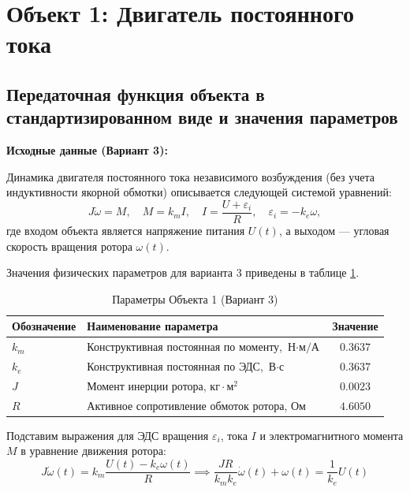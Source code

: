 \documentclass[12pt, a4paper]{article}
\begin{document}
\graphicspath{{images/}}
\newpage
\section{Объект 1: Двигатель постоянного тока}

\subsection{Передаточная функция объекта в стандартизированном виде и значения параметров}

\textbf{Исходные данные (Вариант 3):}

Динамика двигателя постоянного тока независимого возбуждения (без учета индуктивности якорной обмотки) описывается следующей системой уравнений:
\begin{equation}
    J\dot{\omega} = M, \quad M = k_m I, \quad I = \frac{U + \varepsilon_i}{R}, \quad \varepsilon_i = -k_e\omega,
\end{equation}
где входом объекта является напряжение питания $U(t)$, а выходом — угловая скорость вращения ротора $\omega(t)$.

Значения физических параметров для варианта 3 приведены в таблице \ref{tab:obj1_params}.

\begin{table}[H]
\centering
\caption{Параметры Объекта 1 (Вариант 3)}
\label{tab:obj1_params}
\setlength{\tabcolsep}{10pt} %
\renewcommand{\arraystretch}{1.3} %
\begin{tabular}{@{} >{\raggedright\arraybackslash}p{3cm} >{\raggedright\arraybackslash}p{8.5cm} c @{}}
\toprule
\textbf{Обозначение} & \textbf{Наименование параметра} & \textbf{Значение} \\ \midrule
$k_m$ & Конструктивная постоянная по моменту, $\text{Н}\cdot\text{м/А}$ & $0.3637$ \\
$k_e$ & Конструктивная постоянная по ЭДС, $\text{В}\cdot\text{с}$ & $0.3637$ \\
$J$   & Момент инерции ротора, $\text{кг}\cdot\text{м}^2$ & $0.0023$ \\
$R$   & Активное сопротивление обмоток ротора, $\text{Ом}$ & $4.6050$ \\ \bottomrule
\end{tabular}
\end{table}


Подставим выражения для ЭДС вращения $\varepsilon_i$, тока $I$ и электромагнитного момента $M$ в уравнение движения ротора:
\begin{equation}
    J\dot{\omega}(t) = k_m \frac{U(t) - k_e\omega(t)}{R} \implies \frac{JR}{k_m k_e}\dot{\omega}(t) + \omega(t) = \frac{1}{k_e}U(t)
\end{equation}
\end{document}
